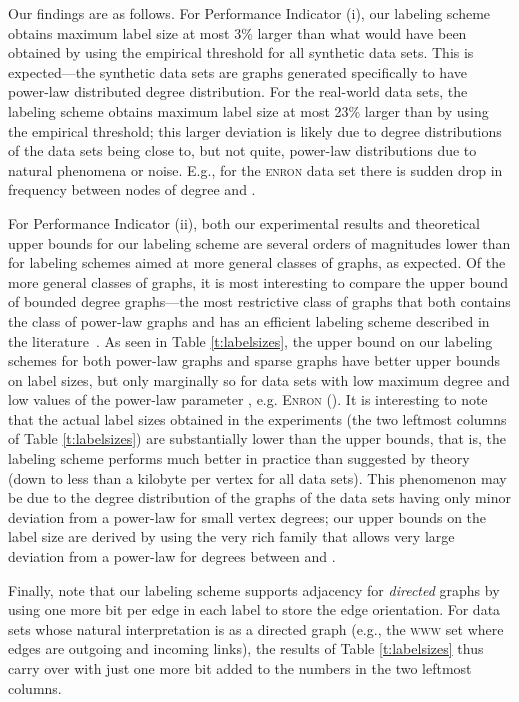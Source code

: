 \documentclass{article}
\theoremstyle{remark}
\begin{document}
Our findings are as follows. For Performance Indicator (i), our labeling scheme obtains maximum label size at most 3\% larger than what would have been obtained by using the empirical threshold for all synthetic data sets.
This is expected---the synthetic data sets are graphs generated specifically to have power-law distributed degree distribution. For the real-world data sets, the labeling scheme
obtains maximum label size at most 23\% larger than by using the empirical threshold; this larger deviation is likely due to degree distributions of the data sets being close to, but not quite,
power-law distributions due to natural phenomena or noise. E.g., for the \textsc{enron} data set there is sudden drop in frequency between nodes of degree  and .

For Performance Indicator (ii), both our experimental results and theoretical upper bounds for our labeling scheme are several orders of magnitudes lower than for labeling schemes aimed at more general classes of graphs, as expected. Of the more general classes of graphs, it is most interesting to compare the upper bound of bounded degree graphs---the most restrictive class of graphs that both contains the class of power-law graphs and has an efficient labeling scheme described in the literature~\cite{adjiashvili2014labeling}. As seen in Table \ref{t:labelsizes}, the upper bound on our labeling schemes for both power-law graphs and sparse graphs have better upper bounds on label sizes, but only marginally so for data sets with low maximum degree and low values of the power-law parameter , e.g. \textsc{Enron} (). 
It is interesting to note that the actual label sizes obtained in the experiments (the two leftmost columns of Table \ref{t:labelsizes}) are substantially lower than the upper bounds, that is,
the labeling scheme performs much better in practice than suggested by theory (down to less than a kilobyte per vertex for all data sets). This phenomenon may be due to the degree distribution of the graphs of the data sets having only minor deviation from a power-law for small vertex degrees; our upper bounds on the label size are derived by using the very rich family  that allows very large deviation from a power-law for degrees between  and .

Finally, note that our labeling scheme supports adjacency for \emph{directed} graphs by using one more bit per edge in each label to store the edge orientation. For data sets whose natural interpretation is as a directed graph (e.g., the \textsc{www} set where edges are outgoing and incoming links), the results of Table \ref{t:labelsizes} thus carry over with just one more bit
added to the numbers in the two leftmost columns.
\end{document}
